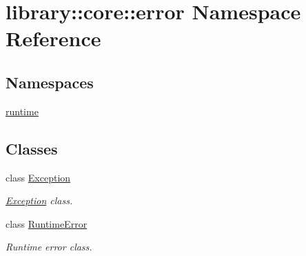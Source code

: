 \hypertarget{namespacelibrary_1_1core_1_1error}{}\section{library\+::core\+::error Namespace Reference}
\label{namespacelibrary_1_1core_1_1error}
\subsection*{Namespaces}
\begin{DoxyCompactItemize}
\item 
 \mbox{\hyperlink{namespacelibrary_1_1core_1_1error_1_1runtime}{runtime}}
\end{DoxyCompactItemize}
\subsection*{Classes}
\begin{DoxyCompactItemize}
\item 
class \mbox{\hyperlink{classlibrary_1_1core_1_1error_1_1_exception}{Exception}}
\begin{DoxyCompactList}\small\item\em \mbox{\hyperlink{classlibrary_1_1core_1_1error_1_1_exception}{Exception}} class. \end{DoxyCompactList}\item 
class \mbox{\hyperlink{classlibrary_1_1core_1_1error_1_1_runtime_error}{Runtime\+Error}}
\begin{DoxyCompactList}\small\item\em Runtime error class. \end{DoxyCompactList}\end{DoxyCompactItemize}
